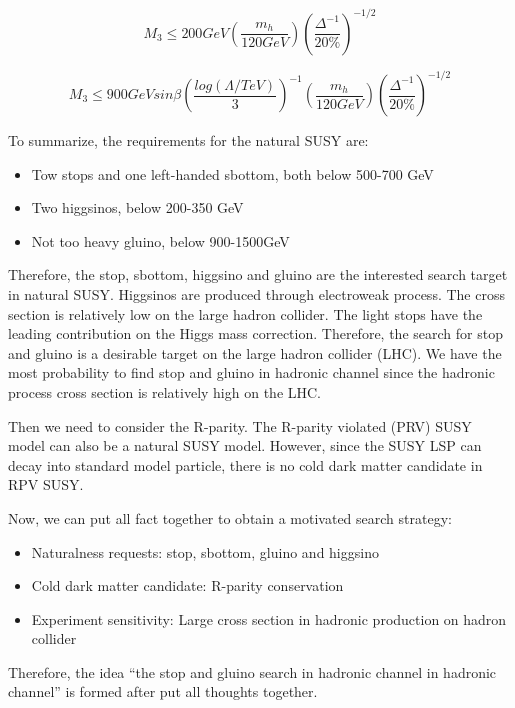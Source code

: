 \begin{equation}
 M_{3} \leq 200GeV (\frac{m_{h}}{120GeV})(\frac{\Delta^{-1}}{20\%})^{-1/2}
 \label{eq:c2nsusyhiggsinobound}
\end{equation}

\begin{equation}
 M_{3} \leq 900GeV sin\beta (\frac{log(\Lambda/TeV)}{3})^{-1}(\frac{m_{h}}{120GeV})(\frac{\Delta^{-1}}{20\%})^{-1/2}
 \label{eq:c2nsusygluinobound}
\end{equation}

To summarize, the requirements for the natural SUSY are:
\begin{itemize}
\item Tow stops and one left-handed sbottom, both below 500-700 GeV
\item Two higgsinos, below 200-350 GeV
\item Not too heavy gluino, below 900-1500GeV
\end{itemize}

Therefore, the stop, sbottom, higgsino and gluino are the interested search target in natural SUSY. Higgsinos are produced through electroweak process. The cross section is relatively low on the large hadron collider. The light stops have the leading contribution on the Higgs mass correction. Therefore, the search for stop and gluino is a desirable target on the large hadron collider (LHC). We have the most probability to find stop and gluino in hadronic channel since the hadronic process cross section is relatively high on the LHC. 

Then we need to consider the R-parity. The R-parity violated (PRV) SUSY model can also be a natural SUSY model. However, since the SUSY LSP can decay into standard model particle, there is no cold dark matter candidate in RPV SUSY. 

Now, we can put all fact together to obtain a motivated search strategy: 
\begin{itemize}
\item Naturalness requests: stop, sbottom, gluino and higgsino
\item Cold dark matter candidate: R-parity conservation
\item Experiment sensitivity: Large cross section in hadronic production on hadron collider
\end{itemize}

Therefore, the idea “the stop and gluino search in hadronic channel in hadronic channel” is formed after put all thoughts together.


